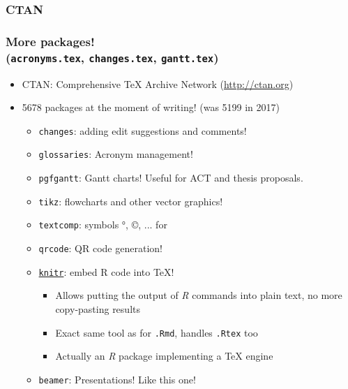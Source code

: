 \documentclass[xetex,colorlinks]{beamer} %
\begin{document}
  \subsubsection{CTAN}
  \begin{frame}
    \frametitle{More packages! \\ (\texttt{acronyms.tex}, \texttt{changes.tex}, \texttt{gantt.tex})}
    \begin{itemize}
     \item CTAN: Comprehensive \TeX{} Archive Network (\href{http://ctan.org}{http://ctan.org})
     \item 5678 packages at the moment of writing! (was 5199 in 2017)
      \begin{itemize}
      \item \texttt{changes}: adding edit suggestions and comments!
      \item \texttt{glossaries}: Acronym management!
      \item \texttt{pgfgantt}: Gantt charts! Useful for ACT and thesis proposals.
      \item \texttt{tikz}: flowcharts and other vector graphics!
      \item \texttt{textcomp}: symbols °, ©, ... for 
      \item \texttt{qrcode}: QR code generation!
      \item \href{https://github.com/yihui/knitr-examples/blob/master/005-latex.Rtex}{\texttt{knitr}}: embed R code into \TeX{}!
      \begin{itemize}
	\item Allows putting the output of \textit{R} commands into plain text, no more copy-pasting results
	\item Exact same tool as for \texttt{.Rmd}, handles \texttt{.Rtex} too
	\item Actually an \textit{R} package implementing a \TeX{} engine
      \end{itemize}
      \item \texttt{beamer}: Presentations! Like this one!
      \end{itemize}
    \end{itemize}
  \end{frame}
\end{document}

